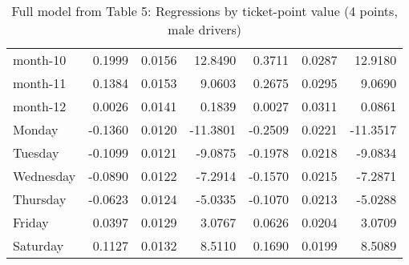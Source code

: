 \documentclass[10pt]{article}
\begin{document}
\begin{table}[ht]
\begin{tabular}{lrrrrrr}
  month-10 & 0.1999 & 0.0156 & 12.8490 & 0.3711 & 0.0287 & 12.9180 \\ 
  month-11 & 0.1384 & 0.0153 & 9.0603 & 0.2675 & 0.0295 & 9.0690 \\ 
  month-12 & 0.0026 & 0.0141 & 0.1839 & 0.0027 & 0.0311 & 0.0861 \\ 
  Monday & -0.1360 & 0.0120 & -11.3801 & -0.2509 & 0.0221 & -11.3517 \\ 
  Tuesday & -0.1099 & 0.0121 & -9.0875 & -0.1978 & 0.0218 & -9.0834 \\ 
  Wednesday & -0.0890 & 0.0122 & -7.2914 & -0.1570 & 0.0215 & -7.2871 \\ 
  Thursday & -0.0623 & 0.0124 & -5.0335 & -0.1070 & 0.0213 & -5.0288 \\ 
  Friday & 0.0397 & 0.0129 & 3.0767 & 0.0626 & 0.0204 & 3.0709 \\ 
  Saturday & 0.1127 & 0.0132 & 8.5110 & 0.1690 & 0.0199 & 8.5089 \\ 
   \hline
\end{tabular}
\caption{Full model from Table 5: Regressions by ticket-point value (4 points, male drivers)} 
\label{tab_5_4_pts_no_age_M}
\end{table}


\clearpage
\pagebreak



\end{document}
